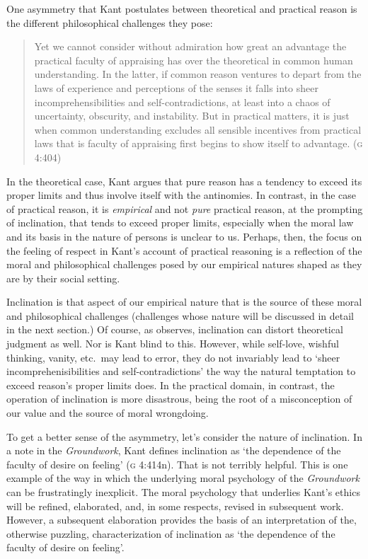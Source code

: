 \documentclass[a4paper,12pt]{article}
\begin{document}

One asymmetry that Kant postulates between theoretical and practical reason is the different philosophical challenges they pose: 
\begin{quote}
    Yet we cannot consider without admiration how great an advantage the practical faculty of appraising has over the theoretical in common human understanding. In the latter, if common reason ventures to depart from the laws of experience and perceptions of the senses it falls into sheer incomprehensibilities and self-contradictions, at least into a chaos of uncertainty, obscurity, and instability. But in practical matters, it is just when common understanding excludes all sensible incentives from practical laws that is faculty of appraising first begins to show itself to advantage. (\textsc{g} 4:404)
\end{quote}
In the theoretical case, Kant argues that pure reason has a tendency to exceed its proper limits and thus involve itself with the antinomies. In contrast, in the case of practical reason, it is \emph{empirical} and not \emph{pure} practical reason, at the prompting of inclination, that tends to exceed proper limits, especially when the moral law and its basis in the nature of persons is unclear to us. Perhaps, then, the focus on the feeling of respect in Kant's account of practical reasoning is a reflection of the moral and philosophical challenges posed by our empirical natures shaped as they are by their social setting. 

Inclination is that aspect of our empirical nature that is the source of these moral and philosophical challenges (challenges whose nature will be discussed in detail in the next section.) Of course, as \citet[133]{Raz:2001ps} observes, inclination can distort theoretical judgment as well. Nor is Kant blind to this. However, while self-love, wishful thinking, vanity, etc.\ may lead to error, they do not invariably lead to `sheer incomprehenisibilities and self-contradictions' the way the natural temptation to exceed reason's proper limits does. In the practical domain, in contrast, the operation of inclination is more disastrous, being the root of a misconception of our value and the source of moral wrongdoing.

To get a better sense of the asymmetry, let's consider the nature of inclination. In a note in the \emph{Groundwork}, Kant defines inclination as `the dependence of the faculty of desire on feeling' (\textsc{g} 4:414n). That is not terribly helpful. This is one example of the way in which the underlying moral psychology of the \emph{Groundwork} can be frustratingly inexplicit. The moral psychology that underlies Kant's ethics will be refined, elaborated, and, in some respects, revised in subsequent work. However, a subsequent elaboration provides the basis of an interpretation of the, otherwise puzzling, characterization of inclination as `the dependence of the faculty of desire on feeling'.
\end{document}

